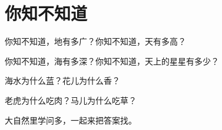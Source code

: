 \documentclass[12pt,UTF-8,openany]{ctexbook}
\begin{document}
\clearpage

\begin{center}
    
    
\end{center}


\hanzibox{}\hanzibox{}\hanzibox{}\hanzibox{}\hspace{1em}\hanzibox{}\hanzibox{}\hanzibox{}\hanzibox{}

\hanzibox{}\hanzibox{}\hanzibox{}\hanzibox{}\hspace{1em}\hanzibox{}\hanzibox{}\hanzibox{}\hanzibox{}

\hanzibox{}\hanzibox{}\hanzibox{}\hanzibox{}\hspace{1em}\hanzibox{}\hanzibox{}\hanzibox{}\hanzibox{}

\hanzibox{}\hanzibox{}\hanzibox{}\hanzibox{}\hspace{1em}\hanzibox{}\hanzibox{}\hanzibox{}\hanzibox{}

\hanzibox{}\hanzibox{}\hanzibox{}\hanzibox{}\hspace{1em}




\chapter{你知不知道}

\begin{large}
    
    你知不知道，地有多广？你知不知道，天有多高？
    
    你知不知道，海有多深？你知不知道，天上的星星有多少？
    
    海水为什么蓝？花儿为什么香？
    
    老虎为什么吃肉？马儿为什么吃草？
    
    大自然里学问多，一起来把答案找。
    
\end{large}


\clearpage

\begin{center}
    
    
\end{center}
\end{document}
